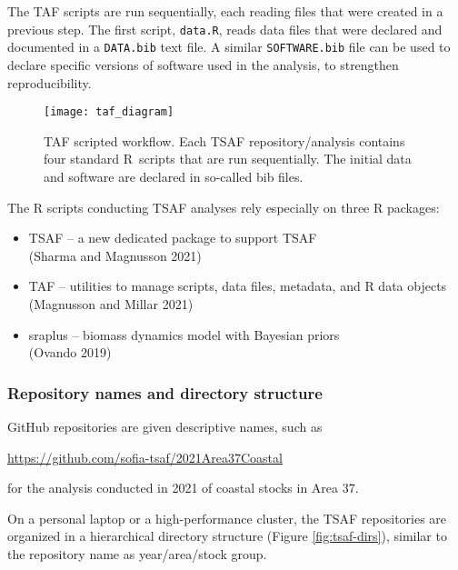 \documentclass[12pt]{article}
\newcommand\blue[1]{\textcolor{darkblue}{#1}}
\begin{document}
The TAF scripts are run sequentially, each reading files that were created in a
previous step. The first script, \verb|data.R|, reads data files that were
declared and documented in a \verb|DATA.bib| text file. A similar
\verb|SOFTWARE.bib| file can be used to declare specific versions of software
used in the analysis, to strengthen reproducibility.

\begin{figure}[htb]
  \begin{center}
    \texttt{[image: taf\_diagram]}
    \vspace{2ex}
    \caption{TAF scripted workflow. Each TSAF repository/analysis contains four
      standard R~scripts that are run sequentially. The initial data and
      software are declared in so-called bib files.}
    \label{fig:taf-diagram}
  \end{center}
\end{figure}

\newpage

The R scripts conducting TSAF analyses rely especially on three R
packages:\\[-2ex]

\begin{itemize}
  \item {\sf TSAF} -- a new dedicated package to support TSAF\\
  (Sharma and Magnusson 2021)
  \item {\sf TAF} -- utilities to manage scripts, data files, metadata, and R
  data objects\\
  (Magnusson and Millar 2021)
  \item {\sf sraplus} -- biomass dynamics model with Bayesian priors\\
  (Ovando 2019)
\end{itemize}

\subsubsection{Repository names and directory structure}

GitHub repositories are given descriptive names, such as

\qquad\blue{\url{https://github.com/sofia-tsaf/2021Area37Coastal}}

for the analysis conducted in 2021 of coastal stocks in Area 37.

On a personal laptop or a high-performance cluster, the TSAF repositories are
organized in a hierarchical directory structure (Figure \ref{fig:tsaf-dirs}),
similar to the repository name as year/area/stock group.\\
\end{document}
